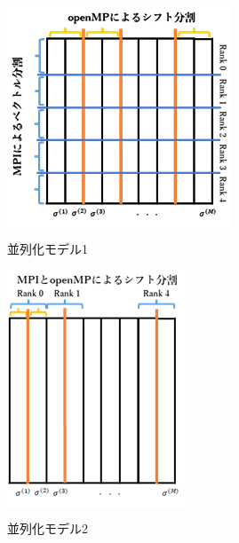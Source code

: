 


\begin{figure}[H]
	\begin{center}
		\begin{minipage}[]{0.49\columnwidth}
			\centering
			\colorbox{white}{ \includegraphics[scale=1.8]{./fig/parallel-model1.png} }
			\caption{並列化モデル1}
			\label{fig-parallel-model1}
		\end{minipage}
		\begin{minipage}[]{0.49\columnwidth}
			\centering
			\colorbox{white}{ \includegraphics[scale=1.8]{./fig/parallel-model2.png} }
			\caption{並列化モデル2}
			\label{fig-parallel-model2}
		\end{minipage}
	\end{center}
\end{figure}
